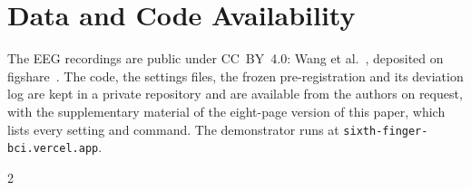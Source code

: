 \documentclass[journal,onecolumn,11pt]{IEEEtran}
\begin{document}
\section*{Data and Code Availability}
{\raggedright
The EEG recordings are public under CC~BY~4.0: Wang et al.~\cite{wang2026dataset}, deposited
on figshare~\cite{wang2026figshare}. The code, the settings files, the frozen
pre-registration and its deviation log are kept in a private repository and are available
from the authors on request, with the supplementary material of the eight-page version of
this paper, which lists every setting and command. The demonstrator runs at \texttt{sixth-finger-bci.vercel.app}.\par}


\begin{multicols}{2}

\end{multicols}
\end{document}
